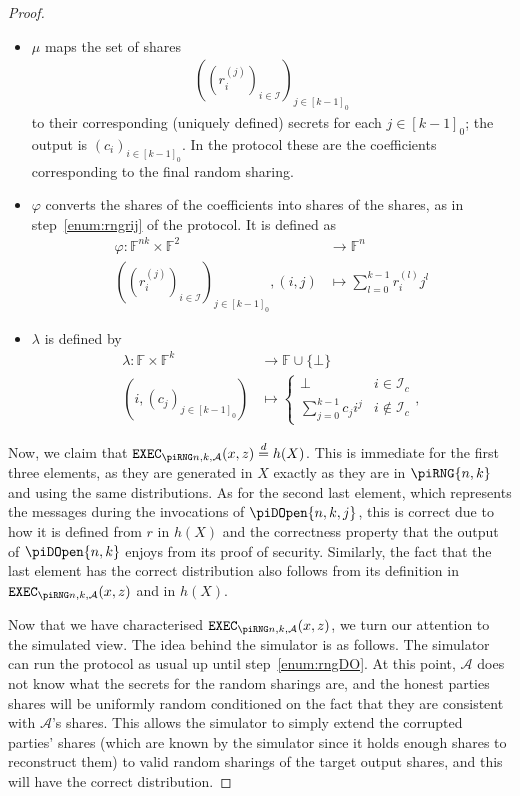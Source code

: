 \documentclass{article}
\newcommand{\eqd}[0]{\stackrel{d}{=}}
\newcommand{\seqZ}[1]{\left[#1\right]_0}
\theoremstyle{remark}
\newcommand{\F}{\mathbb{F}}
\begin{document}
\begin{proof}
\begin{itemize}
		\item $\mu$ maps the set of shares
			\begin{align*}
				{\left(
					{\left(r_i^{(j)}\right)}_{i \in \mathcal{I}}
				\right)}_{j \in \seqZ{k-1}}
			\end{align*}
			to their corresponding (uniquely defined) secrets for each $j \in
			\seqZ{k-1}$; the output is ${(c_i)}_{i \in \seqZ{k-1}}$. In the
			protocol these are the coefficients corresponding to the final
			random sharing.

		\item $\varphi$ converts the shares of the coefficients into shares of
			the shares, as in step~\ref{enum:rngrij} of the protocol. It is
			defined as
			\begin{align*}
				\varphi: \F^{nk} \times \F^2
				&\to
				\F^n\\
				{\left(
					{\left(
						r_i^{(j)}
					\right)}_{i \in \mathcal{I}}
				\right)}_{j \in \seqZ{k-1}},
				(i, j)
				&\mapsto
				\sum_{l=0}^{k-1} r_i^{(l)} j^l
			\end{align*}

		\item $\lambda$ is defined by
			\begin{align*}
				\lambda: \F \times \F^k
				&\to
				\F \cup \{\bot\}\\
				\left(
					i,
					{(c_j)}_{j \in \seqZ{k-1}}
				\right)
				&\mapsto
				\begin{cases}
					\bot & i \in \mathcal{I}_c\\
					\sum_{j=0}^{k-1} c_j i^j & i \notin \mathcal{I}_c
				\end{cases},
			\end{align*}
	\end{itemize}

	Now, we claim that $\execD \eqd h(X)$. This is immediate for the first
	three elements, as they are generated in $X$ exactly as they are in
	$\piRNG{n,k}$ and using the same distributions. As for the second last
	element, which represents the messages during the invocations of
	$\piDOpen{n,k,j}$, this is correct due to how it is defined from $r$ in
	$h(X)$ and the correctness property that the output of $\piDOpen{n,k}$
	enjoys from its proof of security. Similarly, the fact that the last
	element has the correct distribution also follows from its definition in
	$\execD$ and in $h(X)$.

	Now that we have characterised $\execD$, we turn our attention to the
	simulated view. The idea behind the simulator is as follows. The simulator
	can run the protocol as usual up until step~\ref{enum:rngDO}. At this
	point, $\mathcal{A}$ does not know what the secrets for the random sharings
	are, and the honest parties shares will be uniformly random conditioned on
	the fact that they are consistent with $\mathcal{A}$'s shares. This allows
	the simulator to simply extend the corrupted parties' shares (which are
	known by the simulator since it holds enough shares to reconstruct them) to
	valid random sharings of the target output shares, and this will have the
	correct distribution.


\end{proof}
\end{document}
